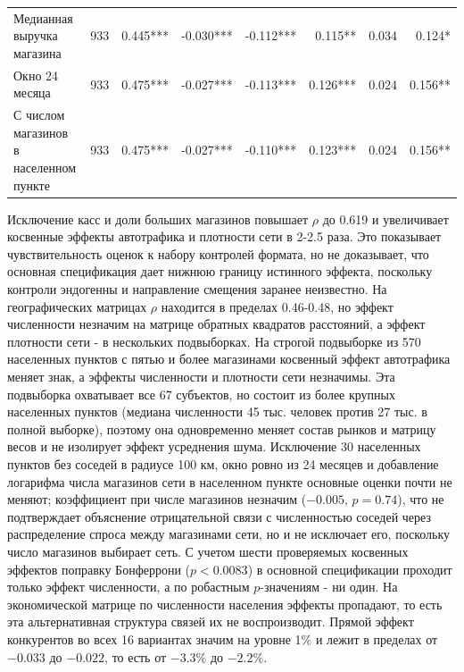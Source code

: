 \documentclass[12pt, a4paper]{article}
\begin{document}
\begin{table}[H]
\begin{tabular}{>{\raggedright\arraybackslash}p{4.6cm}rrrrrrr}
        \midrule
        Медианная выручка магазина & 933 & 0.445*** & -0.030*** & -0.112*** & 0.115** & 0.034 & 0.124* \\
        Окно 24 месяца & 933 & 0.475*** & -0.027*** & -0.113*** & 0.126*** & 0.024 & 0.156** \\
        С числом магазинов в населенном пункте & 933 & 0.475*** & -0.027*** & -0.110*** & 0.123*** & 0.024 & 0.156** \\
        \bottomrule
    \end{tabular}
    \par\vspace{1mm}{\footnotesize Примечание: ADE - прямой эффект, AIE - косвенный эффект; *, **, *** - значимость на уровнях 10\%, 5\% и 1\% по 2000 симуляциям. Источник: расчеты авторов по данным X5 Group, Росстата и GeoNames.}
\end{table}

Исключение касс и доли больших магазинов повышает $\rho$ до 0.619 и увеличивает косвенные эффекты
автотрафика и плотности сети в 2-2.5 раза. Это показывает чувствительность оценок к набору
контролей формата, но не доказывает, что основная спецификация дает нижнюю границу истинного
эффекта, поскольку контроли эндогенны и направление смещения заранее неизвестно. На географических матрицах $\rho$ находится в пределах 0.46-0.48, но эффект
численности незначим на матрице обратных квадратов расстояний, а эффект плотности сети - в
нескольких подвыборках. На строгой подвыборке из 570 населенных пунктов с пятью и более магазинами
косвенный эффект автотрафика меняет знак, а эффекты численности и плотности сети незначимы. Эта
подвыборка охватывает все 67 субъектов, но состоит из более крупных населенных пунктов (медиана численности
45 тыс. человек против 27 тыс. в полной выборке), поэтому она одновременно меняет состав рынков и
матрицу весов и не изолирует эффект усреднения шума. Исключение 30 населенных пунктов без соседей в радиусе
100 км, окно ровно из 24 месяцев и добавление логарифма числа магазинов сети в населенном пункте основные
оценки почти не меняют; коэффициент при числе магазинов незначим ($-0.005$, $p = 0.74$), что не
подтверждает объяснение отрицательной связи с численностью соседей через распределение спроса
между магазинами сети, но и не исключает его, поскольку число магазинов выбирает сеть. С
учетом шести проверяемых косвенных эффектов поправку Бонферрони ($p < 0.0083$) в основной
спецификации проходит только эффект численности, а по робастным $p$-значениям - ни один. На
экономической матрице по численности населения эффекты пропадают, то есть эта альтернативная
структура связей их не воспроизводит. Прямой эффект конкурентов во всех 16 вариантах значим на
уровне 1\% и лежит в пределах от $-0.033$ до $-0.022$, то есть от $-3.3\%$ до $-2.2\%$.
\end{document}
